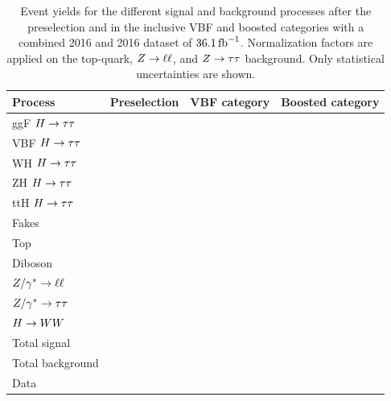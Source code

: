 \begin{table}[htpb]
    \centering
    \caption{Event yields for the different signal and background processes after the preselection
             and in the inclusive VBF and boosted categories with a combined 2016 and 2016 dataset of $\SI{36.1}{\invfb}$.
             Normalization factors are applied on the top-quark, $Z \to \ell \ell$, and $Z \to \tau \tau$ background.
             Only statistical uncertainties are shown.}\label{tab:event_selection:yields}
    \begin{tabular}{lrrr}
        \toprule
        Process             & Preselection & VBF category & Boosted category \\ \midrule
        ggF $H \to \tau \tau$          & & & \\
        VBF $H \to \tau \tau$          & & & \\
        WH  $H \to \tau \tau$          & & & \\
        ZH  $H \to \tau \tau$          & & & \\
        ttH $H \to \tau \tau$          & & & \\ \midrule
        Fakes               & & & \\
        Top                 & & & \\
        Diboson             & & & \\
        $Z / \gamma^* \to \ell \ell$         & & & \\
        $Z / \gamma^* \to \tau \tau$         & & & \\
        $H \to WW$              & & & \\ \midrule
        Total signal        & & & \\
        Total background    & & & \\ \midrule
        Data                & & & \\ \bottomrule
    \end{tabular}
\end{table}
